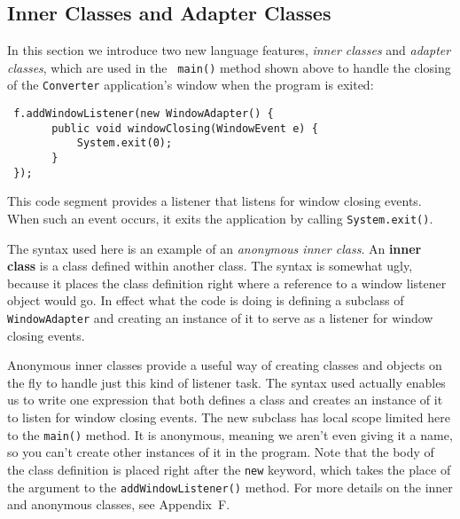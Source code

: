 \subsection{Inner Classes and Adapter Classes}

\noindent In this section we introduce two new language features, {\em
inner classes} and {\em adapter classes}, which are used in the {\tt
main()} method shown above to handle the closing of the
{\tt Converter} application's window when the program is exited: 

\begin{jjjlisting}
\begin{lstlisting}
 f.addWindowListener(new WindowAdapter() { 
       public void windowClosing(WindowEvent e) {
           System.exit(0);
       }
 });
\end{lstlisting}
\end{jjjlisting}

\noindent This code segment provides a listener that listens for
window closing events.  When such an event occurs, it exits the
application by calling {\tt System.exit()}.

The syntax used here is an example of an {\it anonymous inner class}.
An {\bf inner class} is a class defined within another class.  The
syntax is somewhat ugly, because it places the class definition right
where a reference to a window listener object would go.  In effect
what the code is doing is defining a subclass of {\tt WindowAdapter}
and creating an instance of it to serve as a listener for window
closing events.

Anonymous inner classes provide a useful way of creating classes and
objects on the fly to handle just this kind of listener task.  The
syntax used actually enables us to write one expression that both
defines a class and creates an instance of it to listen for window
closing events.   The new subclass has local scope limited here to the
{\tt main()} method.  It is anonymous, meaning we aren't even
giving it a name, so you can't create other instances of it in the
program.   Note that the body of the class definition is placed right
after the {\tt new} keyword, which takes the place of the argument to
the {\tt addWindowListener()} method.   For more details on the inner
and anonymous classes, see Appendix~F.


